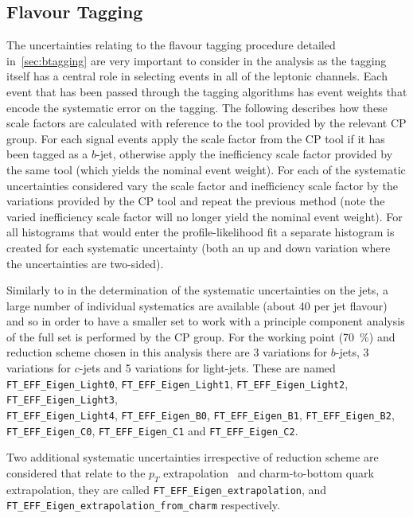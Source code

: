 \subsection{Flavour Tagging}

The uncertainties relating to the flavour tagging procedure detailed
in~\ref{sec:btagging} are very important to consider in the analysis as the
tagging itself has a central role in selecting events in all of the leptonic
channels. Each event that has been passed through the tagging algorithms has
event weights that encode the systematic error on the tagging. The following
describes how these scale factors are calculated with reference to the tool
provided by the relevant CP group. For each signal events apply the scale factor
from the CP tool if it has been tagged as a $b$-jet, otherwise apply the
inefficiency scale factor provided by the same tool (which yields the nominal
event weight). For each of the systematic uncertainties considered vary the
scale factor and inefficiency scale factor by the variations provided by the CP
tool and repeat the previous method (note the varied inefficiency scale factor
will no longer yield the nominal event weight). For all histograms that would
enter the profile-likelihood fit a separate histogram is created for each
systematic uncertainty (both an up and down variation where the uncertainties
are two-sided).

Similarly to in the determination of the systematic uncertainties on the jets, a
large number of individual systematics are available (about 40 per jet flavour)
and so in order to have a smaller set to work with a principle component
analysis of the full set is performed by the CP group. For the working point
(70~\%) and reduction scheme chosen in this analysis there are 3 variations for
$b$-jets, 3 variations for $c$-jets and 5 variations for light-jets. These are
named \texttt{FT\_EFF\_Eigen\_Light0}, \texttt{FT\_EFF\_Eigen\_Light1},
\texttt{FT\_EFF\_Eigen\_Light2}, \texttt{FT\_EFF\_Eigen\_Light3},\\
\texttt{FT\_EFF\_Eigen\_Light4}, \texttt{FT\_EFF\_Eigen\_B0},
\texttt{FT\_EFF\_Eigen\_B1}, \texttt{FT\_EFF\_Eigen\_B2},
\texttt{FT\_EFF\_Eigen\_C0}, \texttt{FT\_EFF\_Eigen\_C1} and
\texttt{FT\_EFF\_Eigen\_C2}.

Two additional systematic uncertainties irrespective of reduction scheme are
considered that relate to the $p_T$ extrapolation~\cite{BTaggingExtrap2015} and
charm-to-bottom quark extrapolation, they are called
\texttt{FT\_EFF\_Eigen\_extrapolation}, and
\texttt{FT\_EFF\_Eigen\_extrapolation\_from\_charm} respectively.

